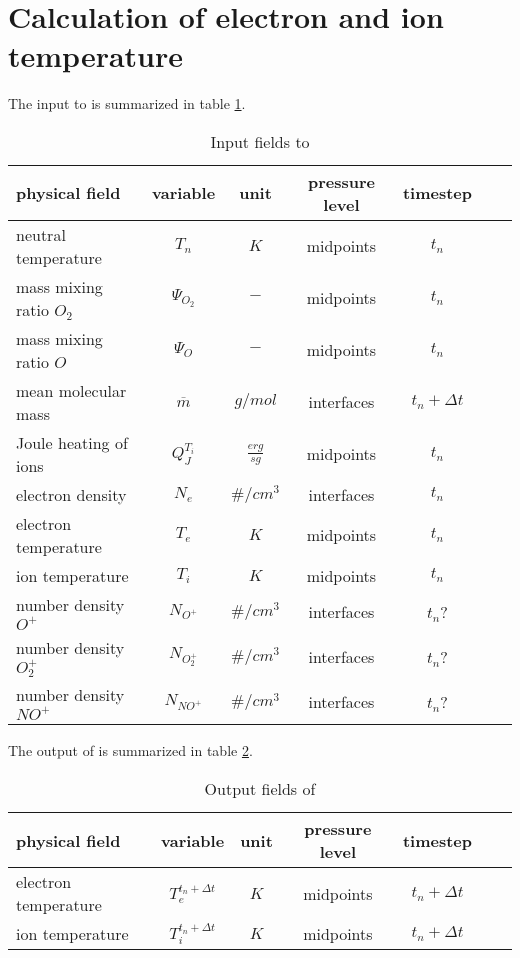 %
\section{Calculation of electron and ion temperature  }\label{cap:settei}
%
The input to  is summarized in table
\ref{tab:input_settei}.
%
\begin{table}[tb]
\begin{tabular}{|p{3.5cm} ||c|c|c|c|c|c|} \hline
physical field               & variable        & unit&pressure
level& timestep
\\ \hline \hline
%
neutral temperature &       $T_n$              & $K$   &  midpoints & $t_n$\\
mass mixing ratio $O_2$&       {$\Psi_{O_2}$}     & $-$   & midpoints  & $t_n$\\
mass mixing ratio $O$&       {$\Psi_{O}$}     & $-$   &  midpoints & $t_n$\\
mean molecular mass&       {$\overline{m}$}     & $g/mol$   & interfaces  &$t_n + \Delta t$ \\
Joule heating of ions&       {$Q_{J}^{T_i}$}     & $\frac{erg}{s g}$   & midpoints  &  $t_n$\\
electron density &       $N_e$              & $\#/cm^3$   &  interfaces & $t_n$\\
electron temperature &       $T_e$              & $K$   &  midpoints & $t_n$\\
ion temperature &       $T_i$              & $K$   &  midpoints & $t_n$\\
number density $O^+$   &      $N_{O^+}$              & $\#/cm^3$   & interfaces & $t_n$?\\
number density $O_2^+$ &      $N_{O_2^+}$            & $\#/cm^3$   & interfaces & $t_n$?\\
number density $NO^+$  &      $N_{NO^+}$             & $\#/cm^3$   &
interfaces& $t_n$?
\\ \hline \hline
\end{tabular}
\caption{Input fields to }
\label{tab:input_settei}
\end{table}
%
The output of  is summarized in table
\ref{tab:output_settei}.
%
\begin{table}[tb]
\begin{tabular}{|p{3.5cm} ||c|c|c|c|c|c|} \hline
physical field               & variable        & unit&pressure
level& timestep \\ \hline \hline
electron temperature    &       {$T_e^{t_n+\Delta t}$}     & $K$   & midpoints  & $t_n+\Delta t$ \\
ion temperature     &       {$T_i^{t_n+\Delta t}$}     & $K$   &
midpoints & $t_n+\Delta t$
\\ \hline \hline
\end{tabular}
\caption{Output fields of }
\label{tab:output_settei}
\end{table}
